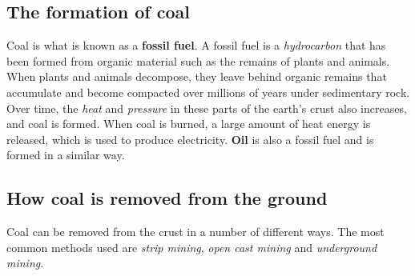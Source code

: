 \subsection{The formation of coal}

Coal is what is known as a \textbf{fossil fuel}. A fossil fuel is a \textit{hydrocarbon} that has been formed from organic material such as the remains of plants and animals. When plants and animals decompose, they leave behind organic remains that accumulate and become compacted over millions of years under sedimentary rock. Over time, the \textit{heat} and \textit{pressure} in these parts of the earth's crust also increases, and coal is formed. When coal is burned, a large amount of heat energy is released, which is used to produce electricity. \textbf{Oil} is also a fossil fuel and is formed in a similar way. 


\subsection{How coal is removed from the ground}

Coal can be removed from the crust in a number of different ways. The most common methods used are \textit{strip mining}, \textit{open cast mining} and \textit{underground mining}.

